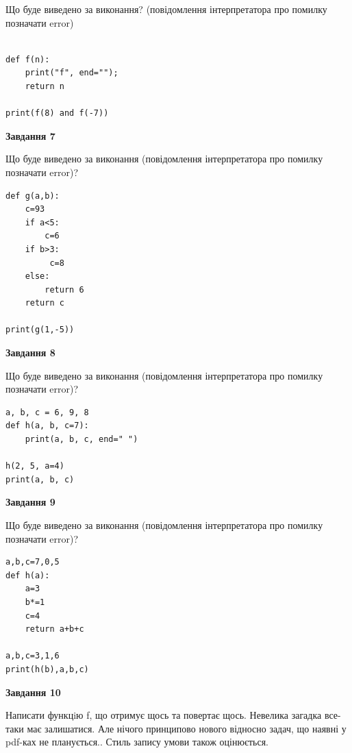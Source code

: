 \documentclass[12pt, ukrainian]{article}
\begin{document}
{\begin {large}
Що буде виведено за виконання? (повідомлення інтерпретатора про помилку позначати error)\par
\begin{verbatim}

def f(n):
    print("f", end="");
    return n

print(f(8) and f(-7))
\end{verbatim}

{\begin {center}\textbf{Завдання 7}\end {center}}

Що буде виведено за виконання (повідомлення інтерпретатора про помилку позначати error)?\par
\begin{verbatim}
def g(a,b):
    c=93
    if a<5:
        c=6
    if b>3:
         c=8
    else: 
        return 6
    return c

print(g(1,-5))
\end{verbatim}

{\begin {center}\textbf{Завдання 8}\end {center}}

Що буде виведено за виконання (повідомлення інтерпретатора про помилку позначати error)?\par
\begin{verbatim}
a, b, c = 6, 9, 8
def h(a, b, c=7):
    print(a, b, c, end=" ")

h(2, 5, a=4)
print(a, b, c)
\end{verbatim}

{\begin {center}\textbf{Завдання 9}\end {center}}

Що буде виведено за виконання (повідомлення інтерпретатора про помилку позначати error)?\par
\begin{verbatim}
a,b,c=7,0,5
def h(a):
    a=3
    b*=1
    c=4
    return a+b+c

a,b,c=3,1,6
print(h(b),a,b,c)
\end{verbatim}

{\begin {center}\textbf{Завдання 10}\end {center}}


Написати функцiю f, що отримує щось та повертає щось. Невелика загадка все-таки має залишатися. Але нічого принципово нового відносно задач, що наявні у pdf-ках не планується.. Стиль запису умови також оцінюється.\par
\end {large}}
\newpage
\end{document}
